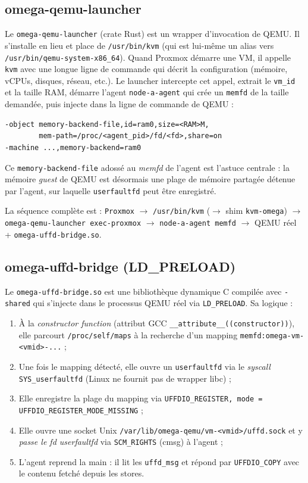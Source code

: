 \subsection{omega-qemu-launcher}

Le \texttt{omega-qemu-launcher} (crate Rust) est un wrapper d'invocation de QEMU. Il s'installe en lieu et place de \texttt{/usr/bin/kvm} (qui est lui-même un alias vers \texttt{/usr/bin/qemu-system-x86\_64}). Quand Proxmox démarre une VM, il appelle \texttt{kvm} avec une longue ligne de commande qui décrit la configuration (mémoire, vCPUs, disques, réseau, etc.). Le launcher intercepte cet appel, extrait le \texttt{vm\_id} et la taille RAM, démarre l'agent \texttt{node-a-agent} qui crée un \texttt{memfd} de la taille demandée, puis injecte dans la ligne de commande de QEMU :

\begin{lstlisting}[basicstyle=\ttfamily\footnotesize, frame=single]
-object memory-backend-file,id=ram0,size=<RAM>M,
        mem-path=/proc/<agent_pid>/fd/<fd>,share=on
-machine ...,memory-backend=ram0
\end{lstlisting}

Ce \texttt{memory-backend-file} adossé au \emph{memfd} de l'agent est l'astuce centrale : la mémoire \emph{guest} de QEMU est désormais une plage de mémoire partagée détenue par l'agent, sur laquelle \texttt{userfaultfd} peut être enregistré.

La séquence complète est : \texttt{Proxmox} $\to$ \texttt{/usr/bin/kvm} ($\to$ shim \texttt{kvm-omega}) $\to$ \texttt{omega-qemu-launcher exec-proxmox} $\to$ \texttt{node-a-agent memfd} $\to$ QEMU réel + \texttt{omega-uffd-bridge.so}.

\subsection{omega-uffd-bridge (LD\_PRELOAD)}

Le \texttt{omega-uffd-bridge.so} est une bibliothèque dynamique C compilée avec \texttt{-shared} qui s'injecte dans le processus QEMU réel via \texttt{LD\_PRELOAD}. Sa logique :

\begin{enumerate}[leftmargin=*]
    \item À la \emph{constructor function} (attribut GCC \texttt{\_\_attribute\_\_((constructor))}), elle parcourt \texttt{/proc/self/maps} à la recherche d'un mapping \texttt{memfd:omega-vm-<vmid>-...} ;
    \item Une fois le mapping détecté, elle ouvre un \texttt{userfaultfd} via le \emph{syscall} \texttt{SYS\_userfaultfd} (Linux ne fournit pas de wrapper libc) ;
    \item Elle enregistre la plage du mapping via \texttt{UFFDIO\_REGISTER, mode = UFFDIO\_REGISTER\_MODE\_MISSING} ;
    \item Elle ouvre une socket Unix \texttt{/var/lib/omega-qemu/vm-<vmid>/uffd.sock} et y \emph{passe le fd userfaultfd} via \texttt{SCM\_RIGHTS} (cmsg) à l'agent ;
    \item L'agent reprend la main : il lit les \texttt{uffd\_msg} et répond par \texttt{UFFDIO\_COPY} avec le contenu fetché depuis les stores.
\end{enumerate}

